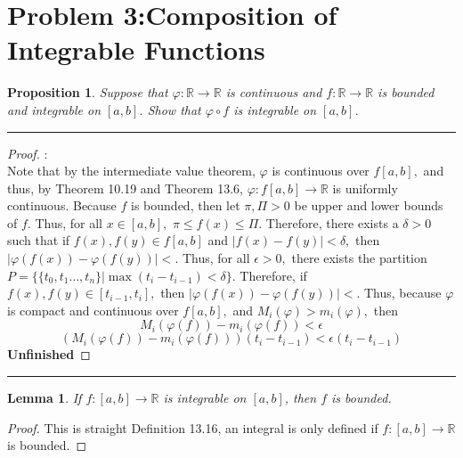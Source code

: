 \documentclass[openany, amssymb, psamsfonts]{amsart}
\newcommand{\bbR}{\mathbb{R}}
\renewcommand{\phi}{\varphi}
\newtheorem{prop}{Proposition}[section]
\newtheorem{lem}{Lemma}[section]
\theoremstyle{definition}
\numberwithin{equation}{section}
\begin{document}
\newpage
\section*{Problem 3:Composition of Integrable Functions}
\begin{prop}
Suppose that $\phi : \bbR\to\bbR$ is continuous and $f: \bbR \to \bbR$ is bounded and integrable on $[a,b]$.  Show that $\phi \circ f$ is integrable on $[a,b]$.    
\end{prop}
\vspace{4pt}     \hrule   \vspace{4pt}\begin{proof}:\\
Note that by the intermediate value theorem, $\phi$ is continuous over $f[a,b],$ and thus, by Theorem 10.19 and Theorem {13.6}, $\phi: f[a,b]\to \bbR$ is uniformly continuous. Because $f$ is bounded, then let $\pi, \Pi>0$ be upper and lower bounds of $f.$ Thus, for all $x\in [a,b],$ $\pi\leq f(x)\leq \Pi.$ Therefore, there exists a $\delta >0$ such that if $f(x), f(y)\in f[a,b]$ and $|f(x) - f(y)|< \delta,$ then $|\varphi(f(x)) - \phi(f(y))|<.$ Thus, for all $\epsilon>0,$ there exists the partition $P = \{\{t_0, t_1 \dots, t_n\}| \max(t_i - t_{i-1})<\delta\}.$ Therefore, if $f(x), f(y) \in [t_{i-1}, t_i],$ then $|\phi(f(x)) - \phi(f(y))|<.$ Thus, because $\phi$ is compact and continuous over $f[a,b],$ and $M_i(\varphi)> m_i(\phi),$ then \[M_i(\varphi(f)) - m_i(\phi(f)) < \epsilon\]
\[(M_i(\varphi(f)) - m_i(\phi(f)))(t_i - t_{i-1}) < \epsilon(t_i - t_{i-1})\]
\textbf{Unfinished}
\end{proof}\vspace{4pt}     \hrule   \vspace{4pt}

\begin{lem}
    If $f: [a,b] \to \bbR$ is integrable on $[a,b]$, then $f$ is bounded.
\end{lem}
\begin{proof}
    This is straight Definition {13.16}, an integral is only defined if $f:[a,b]\to \bbR$ is bounded. 
\end{proof}
\end{document}

